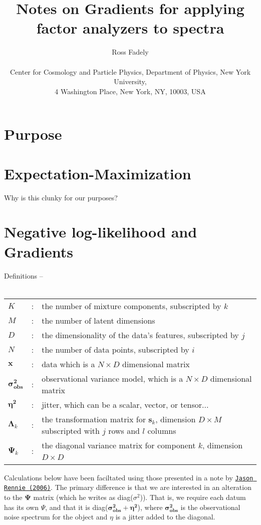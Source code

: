 \documentclass[letterpaper,12pt]{article}
\title{Notes on Gradients for applying factor analyzers to spectra}
\author{Ross Fadely\nyu\\
\\
\small
\nyu Center for Cosmology and Particle Physics,
                        Department of Physics, New York University,\\ \small
                        4 Washington Place, New York, NY, 10003, USA \\
}
\newcommand{\vect}[1]{\boldsymbol{#1}}
\newcommand{\data}{\vect{x}}
\newcommand{\latent}{\vect{s}}
\newcommand{\lmda}{\vect{\Lambda}}
\newcommand{\ps}{\vect{\Psi}}
\newcommand{\sig}{\vect{\sigma_{obs}^2}}
\newcommand{\et}{\vect{\eta^2}}
\begin{document}
\maketitle


\section{Purpose}


\section{Expectation-Maximization}

Why is this clunky for our purposes?

\section{Negative log-likelihood and Gradients}

Definitions -- \\ \\
\begin{tabular}{lcl}
$K$ &:&the number of mixture components, subscripted by $k$\\
$M$&:& the number of latent dimensions\\
$D$&:& the dimensionality of the data's features, subscripted by $j$\\
$N$ &:&the number of data points, subscripted by $i$\\
$\data$ &:&data which is a $N \times D$ dimensional matrix\\ 
$\sig$ &:& observational variance model, which is a $N \times D$ dimensional matrix\\ 
$\et$ &:& jitter, which can be a scalar, vector, or tensor...\\ 
$\lmda_k$ &:&the transformation matrix for $\latent_k$, dimension
$D \times M$ subscripted with $j$ rows and $l$ columns\\
$\ps_k$ &:&the diagonal variance matrix for component $k$, dimension $D\times D$\
\end{tabular}

\vspace{12pt}
Calculations below have been faciltated using those presented 
in a note by {\tt \href{http://bit.ly/11JqOFK}{Jason Rennie (2006)}}.
The primary difference is that we are interested in an alteration to
the $\ps$ matrix (which he writes as diag($\sigma^2$)).  That is, 
we require each datum has its own $\Psi$, and that it is 
diag($\sig+\et$), where $\sig$ is the
observational noise spectrum for the object and $\eta$ is a jitter
added to the diagonal. \\
\end{document}
